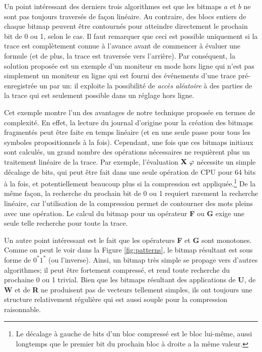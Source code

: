 Un point intéressant des derniers trois algorithmes est que les bitmaps $a$ et $b$ ne sont pas toujours traversés de façon linéaire. Au contraire, des blocs entiers de chaque bitmap peuvent être contournés pour atteindre directement le prochain bit de 0 ou 1, selon le cas. Il faut remarquer que ceci est possible uniquement si la trace est complètement connue à l'avance avant de commencer à évaluer une formule (et de plus, la trace est traversée vers l'arrière). Par conséquent, la solution proposée est un exemple d'un moniteur en mode hors ligne qui n'est pas simplement un moniteur en ligne qui est fourni des événements d'une trace pré-enregistrée un par un: il exploite la possibilité de \emph{accès aléatoire} à des parties de la trace qui est seulement possible dans un réglage hors ligne.

Cet exemple montre l'un des avantages de notre technique proposée en termes de complexité. En effet, la lecture du journal d'origine pour la création des bitmaps fragmentés peut être faite en temps linéaire (et en une seule passe pour tous les symboles propositionnels à la fois). Cependant, une fois que ces bitmaps initiaux sont calculés, un grand nombre des opérations nécessaires ne requièrent plus un traitement linéaire de la trace. Par exemple, l'évaluation $\mathop{\mbox{\textbf{X}}}\,\varphi$ nécessite un simple décalage de bits, qui peut être fait dans une seule opération de CPU pour 64 bits à la fois, et potentiellement beaucoup plus si la compression est appliquée.\footnote{Le décalage à gauche de bits d'un bloc compressé est le bloc lui-même, aussi longtemps que le premier bit du prochain bloc à droite a la même valeur.} De la même façon, la recherche du prochain bit de 0 ou 1 requiert rarement la recherche linéaire, car l'utilisation de la compression permet de contourner des mots pleins avec une opération. Le calcul du bitmap pour un opérateur \textbf{F} ou \textbf{G} exige une seule telle recherche pour toute la trace.

Un autre point intéressant est le fait que les opérateurs \textbf{F} et \textbf{G} sont monotones. Comme on peut le voir dans la Figure \ref{fig:patterns}, le bitmap résultant est sous forme de $0^*1^*$ (ou l'inverse). Ainsi, un bitmap très simple se propage vers d'autres algorithmes; il peut être fortement compressé, et rend toute recherche du prochaine 0 ou 1 trivial. Bien que les bitmaps résultant des applications de \textbf{U}, de \textbf{W} et de \textbf{R} ne produisent pas de vecteurs tellement simples, ils ont toujours une structure relativement régulière qui est aussi souple pour la compression raisonnable.

